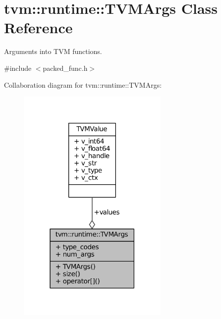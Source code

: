 \hypertarget{classtvm_1_1runtime_1_1TVMArgs}{}\section{tvm\+:\+:runtime\+:\+:T\+V\+M\+Args Class Reference}
\label{classtvm_1_1runtime_1_1TVMArgs}


Arguments into T\+VM functions.  




{\ttfamily \#include $<$packed\+\_\+func.\+h$>$}



Collaboration diagram for tvm\+:\+:runtime\+:\+:T\+V\+M\+Args\+:
\nopagebreak
\begin{figure}[H]
\begin{center}
\leavevmode
\includegraphics[width=207pt]{classtvm_1_1runtime_1_1TVMArgs__coll__graph}
\end{center}
\end{figure}
